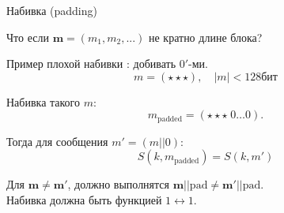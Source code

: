 \documentclass[usenames,dvipsnames,8pt,aspectratio=169]{beamer}
\begin{document}
\begin{frame}{Набивка (padding)}
\Large
\begin{center}
Что если $\mathbf{m} = (m_1, m_2, ...)$ не кратно длине блока?
\end{center}
Пример {\color{Orange} плохой} набивки : добивать $0'$-ми.
\[m = (\star \star \star  ), \quad |m|< 128 \text{бит}\] 

Набивка такого $m$:
\[m_{\text{padded}}=(\star \star \star  \; 0 \ldots 0  ). \] 

Тогда для сообщения $m' = (m||0)$:
\[S(k,m_{\text{padded}}) = S(k, m')\]

\vspace{10pt}
\centering
Для $\mathbf{m} \neq \mathbf{m'}$, должно выполнятся $\mathbf{m}||\text{pad} \neq \mathbf{m'}||\text{pad}$. \\[5pt]
 Набивка должна быть функцией $1 \leftrightarrow 1$.
	
\end{frame}
\end{document}
